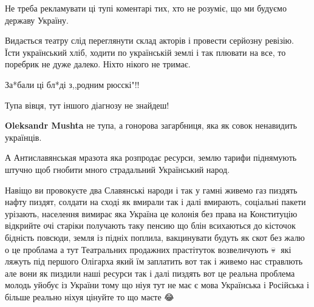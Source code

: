 \begin{itemize}
Не треба рекламувати ці тупі коментарі тих, хто не розуміє, що ми будуємо державу Україну.

 

Видається театру слід переглянути склад акторів і провести серйозну ревізію.
Їсти український хліб, ходити по українській землі і так плювати на все, то
поребрик не дуже далеко. Ніхто нікого не тримає.


 
За*бали ці бл*ді з,,родним рюсскі"!!

 
Тупа вівця, тут іншого діагнозу не знайдеш!

\begin{itemize}
 
\textbf{Oleksandr Mushta} не тупа, а гонорова загарбниця, яка як совок ненавидить українців.
\end{itemize}

 

А Антиславянськая мразота яка розпродає ресурси, землю тарифи піднямують штучно
щоб гнобити много страдальний Український народ. 

Навіщо ви провокуєте два
Славянські народи і так у гамні живемо газ пиздять нафту пиздят, солдати на
сході як вмирали так і далі вмирають, соціальні пакети урізають, населення
вимирає яка Україна це колонія без права на Конституцію відкрийте очі старіки
получають таку пенсию що блін всихаються до кісточок бідність повсюди, земля із
підніх поплила, вакцинувати будуть як скот без жалю о це проблама а тут
Театральних продажних прастітуток возвеличують 💀🤧 які ляжуть під першого
Олігарха який їм заплатить вот так і живемо нас стравлють але вони як пиздили
наші ресурси так і далі пиздять вот це реальна проблема молодь уйобує із
України тому що ніуя тут не має є мова Українська і Російська і більше реально
ніхуя цінуйте то що маєте 😂



\end{itemize}
